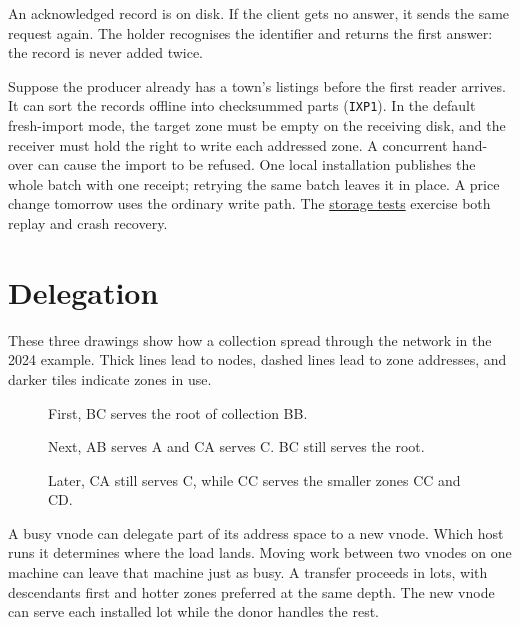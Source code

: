 \documentclass[11pt]{article}
\begin{document}
An acknowledged record is on disk. If the client gets no answer, it sends the same request again. The holder recognises the identifier and returns the first answer: the record is never added twice.

Suppose the producer already has a town's listings before the first reader arrives. It can sort the records offline into checksummed parts (\texttt{IXP1}). In the default fresh-import mode, the target zone must be empty on the receiving disk, and the receiver must hold the right to write each addressed zone. A concurrent hand-over can cause the import to be refused. One local installation publishes the whole batch with one receipt; retrying the same batch leaves it in place. A price change tomorrow uses the ordinary write path. The \href{https://github.com/indexus/core/blob/5188b61/internal/storage/bulk_test.go}{storage tests} exercise both replay and crash recovery.

\section{Delegation}
These three drawings show how a collection spread through the network in the 2024 example. Thick lines lead to nodes, dashed lines lead to zone addresses, and darker tiles indicate zones in use.

\begin{figure}[H]
    \centering
    \caption{First, BC serves the root of collection BB.}
\end{figure}

\begin{figure}[H]
    \centering
    \caption{Next, AB serves A and CA serves C. BC still serves the root.}
\end{figure}

\begin{figure}[H]
    \centering
    \caption{Later, CA still serves C, while CC serves the smaller zones CC and CD.}
\end{figure}

A busy vnode can delegate part of its address space to a new vnode. Which host runs it determines where the load lands. Moving work between two vnodes on one machine can leave that machine just as busy. A transfer proceeds in lots, with descendants first and hotter zones preferred at the same depth. The new vnode can serve each installed lot while the donor handles the rest.
\end{document}
